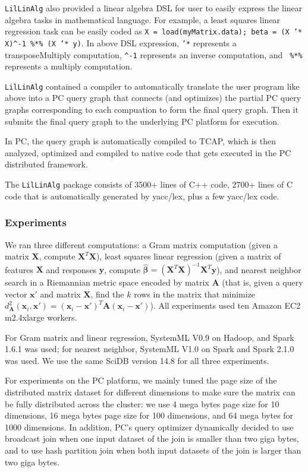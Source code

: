 \texttt{LilLinAlg} also provided a linear algebra DSL for user to
easily express the linear algebra tasks in mathematical language. For
example, a least squares linear regression task can be easily coded as
\texttt{X = load(myMatrix.data); beta = (X '* X)\^{}-1 \%*\% (X '*
  y)}. 
In above DSL expression, \texttt{'*} represents a transposeMultiply computation,
\texttt{\^{}-1} represents an inverse computation, and \texttt{ \%*\%}
represents a multiply computation. 

\texttt{LilLinAlg} contained a compiler
to automatically translate the user program like above into a PC query graph that
connects (and optimizes) the partial PC query graphs corresponding to
each compuation to form the final query graph. Then it submits the
final query graph to the underlying PC platform for execution. 

In PC, the query
graph is automatically compiled to TCAP, which is then analyzed, optimized and compiled to native
code that gets executed in the PC distributed framework.

The \texttt{LilLinAlg} package consists of 3500+ lines of C++ code,
2700+ lines of C code that is automatically generated by yacc/lex, 
plus a few yacc/lex code.

\subsubsection {Experiments}

We ran three different computations:
a Gram matrix computation (given a matrix $\textbf{X}$, compute
$\textbf{X}^T \textbf{X}$), least squares linear regression (given a matrix of features $\textbf{X}$ and
responses $\textbf{y}$, compute 
$\hat{\pmb{\beta}} = (\textbf{X}^{T} \textbf{X})^{-1} \textbf{X}^{T} \textbf{y}$), and nearest
neighbor search in a Riemannian metric space \cite{lebanon2006metric} encoded by matrix $\textbf{A}$ (that is,
given a query vector
$\textbf{x}'$ and matrix $\textbf{X}$, find the $k$ rows in the matrix that minimize 
$d_{\textbf{A}}^2(\textbf{x}_i, \textbf{x}') = 
(\textbf{x}_i - \textbf{x}')^T\textbf{A}(\textbf{x}_i - \textbf{x}')$).  All experiments used
ten Amazon
EC2 m2.4xlarge workers.  

For Gram matrix and linear regression, SystemML V0.9 on Hadoop,
and Spark 1.6.1 was used; for
nearest neighbor, SystemML V1.0 on Spark and Spark 2.1.0 was used. We
use the same SciDB version 14.8 for all three
experiments.

For experiments on the PC platform, we mainly tuned the page size of the
distributed matrix dataset for different dimensions to make sure the
matrix can be fully distributed across the cluster:
we use 4 mega bytes page size for 10 dimensions, 16 mega bytes page
size for 100 dimensions, and 64 mega bytes for 1000 dimensions. 
In addition, PC's query optimizer dynamically decided to use
broadcast join when one input dataset of the join is smaller than two
giga bytes, and to use hash partition join when both input datasets of
the join is larger than two giga bytes.


